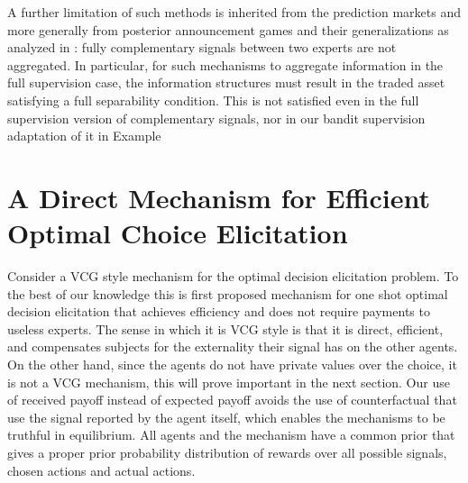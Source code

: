 


A further limitation of such methods is inherited from the prediction markets and more generally from posterior announcement games and their generalizations as analyzed in \cite{ostrovsky2012information}: fully complementary signals between two experts are not aggregated. In particular, for such mechanisms to aggregate information in the full supervision case, the information structures must result in the traded asset satisfying a full separability condition. This is not satisfied even in the full supervision version of complementary signals, nor in our bandit supervision adaptation of it in Example~



\section{A Direct Mechanism for Efficient Optimal Choice Elicitation}

Consider a VCG style mechanism for the optimal decision elicitation problem. 
To the best of our knowledge this is first proposed  mechanism for one shot optimal decision elicitation that achieves efficiency and does not require payments to useless experts.
The sense in which it is VCG style is that it is direct, efficient, and compensates subjects for the externality their signal has on the other agents.
On the other hand, since the agents do not have private values over the choice, it is not a VCG mechanism, this will prove important in the next section.
Our use of received payoff instead of expected payoff avoids the use of counterfactual that use the signal reported by the agent itself, which enables the mechanisms to be truthful in equilibrium.
All agents and the mechanism have a common prior that gives a proper prior probability distribution of rewards over all possible signals, chosen actions and actual actions.

